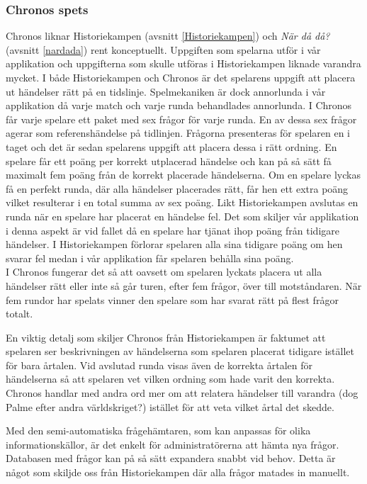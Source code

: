 \documentclass[a4paper, 11pt]{article}
\begin{document}
\subsubsection{Chronos spets}
Chronos liknar Historiekampen (avsnitt \ref{Historiekampen}) och \textit{När då då?} (avsnitt \ref{nardada}) rent konceptuellt. Uppgiften som spelarna utför i vår applikation och uppgifterna som skulle utföras i Historiekampen liknade varandra mycket. I både Historiekampen och Chronos är det spelarens uppgift att placera ut händelser rätt på en tidslinje. Spelmekaniken är dock annorlunda i vår applikation då varje match och varje runda behandlades annorlunda. I Chronos får varje spelare ett paket med sex frågor för varje runda. En av dessa sex frågor agerar som referenshändelse på tidlinjen. Frågorna presenteras för spelaren en i taget och det är sedan spelarens uppgift att placera dessa i rätt ordning. En spelare får ett poäng per korrekt utplacerad händelse och kan på så sätt få maximalt fem poäng från de korrekt placerade händelserna. Om en spelare lyckas få en perfekt runda, där alla händelser placerades rätt, får hen ett extra poäng vilket resulterar i en total summa av sex poäng. Likt Historiekampen avslutas en runda när en spelare har placerat en händelse fel. Det som skiljer vår applikation i denna aspekt är vid fallet då en spelare har tjänat ihop poäng från tidigare händelser. I Historiekampen förlorar spelaren alla sina tidigare poäng om hen svarar fel medan i vår applikation får spelaren behålla sina poäng. \\ I Chronos fungerar det så att oavsett om spelaren lyckats placera ut alla händelser rätt eller inte så går turen, efter fem frågor, över till motståndaren. När fem rundor har spelats vinner den spelare som har svarat rätt på flest frågor totalt.  

En viktig detalj som skiljer Chronos från Historiekampen är faktumet att spelaren ser beskrivningen av händelserna som spelaren placerat tidigare istället för bara årtalen. Vid avslutad runda visas även de korrekta årtalen för händelserna så att spelaren vet vilken ordning som hade varit den korrekta. Chronos handlar med andra ord mer om att relatera händelser till varandra (dog Palme efter andra världskriget?) istället för att veta vilket årtal det skedde.

Med den semi-automatiska frågehämtaren, som kan anpassas för olika informationskällor, är det enkelt för administratörerna att hämta nya frågor. Databasen med frågor kan på så sätt expandera snabbt vid behov. Detta är något som skiljde oss från Historiekampen där alla frågor matades in manuellt.
\end{document}
